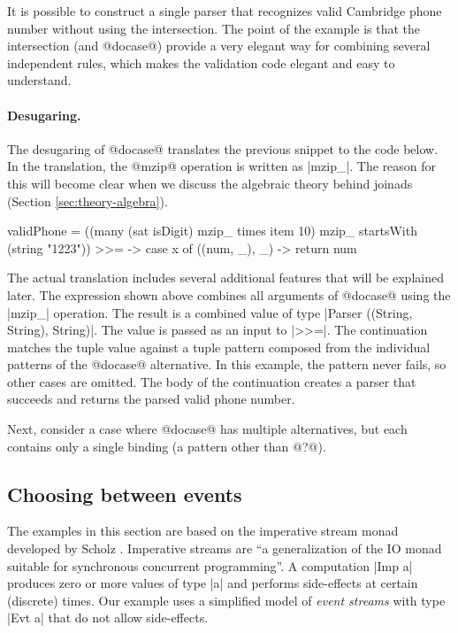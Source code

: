 \documentclass[preprint]{sigplanconf}
\begin{document}
It is possible to construct a single parser that recognizes valid Cambridge phone number without using
the intersection. The point of the example is that the intersection (and @docase@) provide a
very elegant way for combining several independent rules, which makes the validation code
elegant and easy to understand.

\paragraph{Desugaring.}
The desugaring of @docase@ translates the previous snippet to the code below. In the 
translation, the @mzip@ operation is written as |mzip_|. The reason for this will become clear
when we discuss the algebraic theory behind joinads (Section \ref{sec:theory-algebra}).

\begin{code}
validPhone = 
    ((many (sat isDigit) mzip_ times item 10) 
        mzip_ startsWith (string "1223")) >>= \x ->
            case x of ((num, _), _) -> return num
\end{code}
The actual translation includes several additional features that will be explained later.
The expression shown above combines all arguments of @docase@ using the |mzip_| operation. The 
result is a combined value of type |Parser ((String, String), String)|. The value is passed
as an input to |>>=|. The continuation matches the tuple value against a tuple pattern composed 
from the individual patterns of the @docase@ alternative. In this example, the pattern never fails, 
so other cases are omitted. The body of the continuation creates a parser that succeeds and 
returns the parsed valid phone number.

Next, consider a case where @docase@ has multiple alternatives, but each contains only a single
binding (a pattern other than @?@).


\subsection{Choosing between events}
\label{sec:intro-choosing-events}

The examples in this section are based on the imperative stream monad developed by Scholz
\cite{imperative-streams}. Imperative streams are ``a generalization of the IO monad suitable for
synchronous concurrent programming''. A computation |Imp a| produces zero or more
values of type |a| and performs side-effects at certain (discrete) times. Our example uses 
a simplified model of \textit{event streams} with type |Evt a| that do not allow side-effects.
\end{document}
